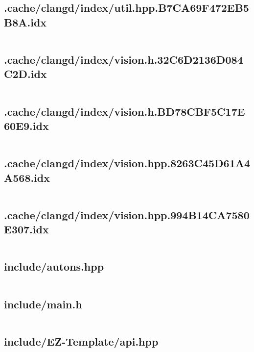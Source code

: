 \subsection{.cache/clangd/index/util.hpp.B7CA69F472EB5B8A.idx}
\inputminted[linenos,tabsize=2,breaklines, breakanywhere]{c}{util.hpp.B7CA69F472EB5B8A.idx}
\pagebreak

\subsection{.cache/clangd/index/vision.h.32C6D2136D084C2D.idx}
\inputminted[linenos,tabsize=2,breaklines, breakanywhere]{c}{vision.h.32C6D2136D084C2D.idx}
\pagebreak

\subsection{.cache/clangd/index/vision.h.BD78CBF5C17E60E9.idx}
\inputminted[linenos,tabsize=2,breaklines, breakanywhere]{c}{vision.h.BD78CBF5C17E60E9.idx}
\pagebreak

\subsection{.cache/clangd/index/vision.hpp.8263C45D61A4A568.idx}
\inputminted[linenos,tabsize=2,breaklines, breakanywhere]{c}{vision.hpp.8263C45D61A4A568.idx}
\pagebreak

\subsection{.cache/clangd/index/vision.hpp.994B14CA7580E307.idx}
\inputminted[linenos,tabsize=2,breaklines, breakanywhere]{c}{vision.hpp.994B14CA7580E307.idx}
\pagebreak

\subsection{include/autons.hpp}
\inputminted[linenos,tabsize=2,breaklines, breakanywhere]{c}{autons.hpp}
\pagebreak

\subsection{include/main.h}
\inputminted[linenos,tabsize=2,breaklines, breakanywhere]{c}{main.h}
\pagebreak

\subsection{include/EZ-Template/api.hpp}
\inputminted[linenos,tabsize=2,breaklines, breakanywhere]{c}{api.hpp}
\pagebreak

